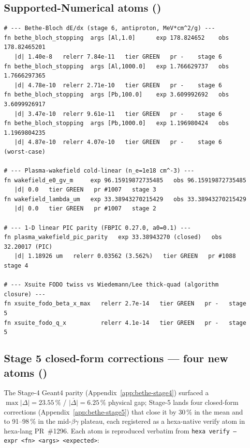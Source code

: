 \subsection{Supported-Numerical atoms (\tierGreen)}
\label{app:vl-green}

\begin{lstlisting}
# --- Bethe-Bloch dE/dx (stage 6, antiproton, MeV*cm^2/g) ---
fn bethe_bloch_stopping  args [Al,1.0]      exp 178.824652    obs 178.82465201
   |d| 1.40e-8   relerr 7.84e-11   tier GREEN   pr -    stage 6
fn bethe_bloch_stopping  args [Al,1000.0]   exp 1.766629737   obs 1.7666297365
   |d| 4.78e-10  relerr 2.71e-10   tier GREEN   pr -    stage 6
fn bethe_bloch_stopping  args [Pb,100.0]    exp 3.609992692   obs 3.6099926917
   |d| 3.47e-10  relerr 9.61e-11   tier GREEN   pr -    stage 6
fn bethe_bloch_stopping  args [Pb,1000.0]   exp 1.196980424   obs 1.1969804235
   |d| 4.87e-10  relerr 4.07e-10   tier GREEN   pr -    stage 6   (worst-case)

# --- Plasma-wakefield cold-linear (n_e=1e18 cm^-3) ---
fn wakefield_e0_gv_m     exp 96.15919872735485   obs 96.15919872735485
   |d| 0.0   tier GREEN   pr #1007   stage 3
fn wakefield_lambda_um   exp 33.38943270215429   obs 33.38943270215429
   |d| 0.0   tier GREEN   pr #1007   stage 2

# --- 1-D linear PIC parity (FBPIC 0.27.0, a0=0.1) ---
fn plasma_wakefield_pic_parity   exp 33.38943270 (closed)   obs 32.20017 (PIC)
   |d| 1.18926 um   relerr 0.03562 (3.562%)   tier GREEN   pr #1088   stage 4

# --- Xsuite FODO twiss vs Wiedemann/Lee thick-quad (algorithm closure) ---
fn xsuite_fodo_beta_x_max   relerr 2.7e-14   tier GREEN   pr -   stage 5
fn xsuite_fodo_q_x          relerr 4.1e-14   tier GREEN   pr -   stage 5
\end{lstlisting}

\subsection{Stage 5 closed-form corrections --- four new atoms (\tierGreen)}
\label{app:vl-stage5}

The Stage-4 Geant4 parity (Appendix~\ref{app:bethe-stage4}) surfaced a
$\max|\Delta|\!=\!23.55\,\%$ / $\overline{|\Delta|}\!=\!6.25\,\%$
physical gap; Stage-5 lands four closed-form corrections
(Appendix~\ref{app:bethe-stage5}) that close it by 30\,\% in the mean
and to 91--98\,\% in the mid-$\beta\gamma$ plateau, each registered as a
hexa-native verify atom in hexa-lang PR~\#1296. Each atom is reproduced
verbatim from \texttt{hexa verify --expr <fn> <args> <expected>}:

